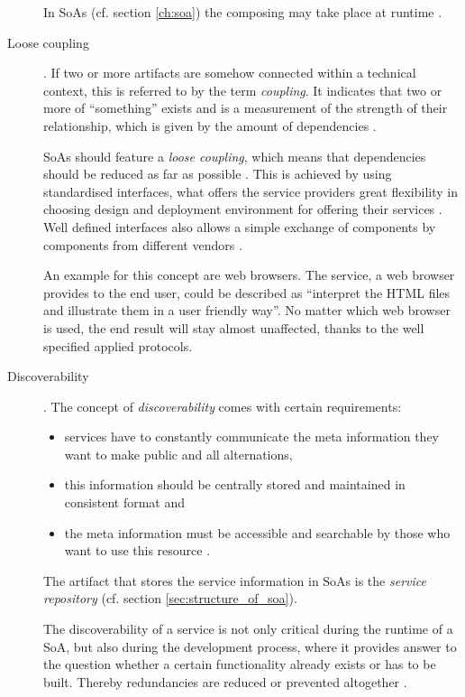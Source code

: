 \begin{description}
In SoAs (cf. section \ref{ch:soa}) the composing may take place at runtime \cite{breivold}.

\item [Loose coupling].
If two or more artifacts are somehow connected within a technical context, this is referred to by the term \emph{coupling}. It indicates that two or more of ``something'' exists and is a measurement of the strength of their relationship, which is given by the amount of dependencies \cite{erl2008}.

SoAs should feature a \emph{loose coupling}, which means that dependencies should be reduced as far as possible \cite{erl2008}. This is achieved by using standardised interfaces, what offers the service providers great flexibility in choosing design and deployment environment for offering their services \cite{breivold} \cite{arrowhead}. Well defined interfaces also allows a simple exchange of components by components from different vendors \cite{scholz}.

An example for this concept are web browsers. The service, a web browser provides to the end user, could be described as ``interpret the HTML files and illustrate them in a user friendly way''. No matter which web browser is used, the end result will stay almost unaffected, thanks to the well specified applied protocols.

\item [Discoverability]. 
The concept of \emph{discoverability} comes with certain requirements:
	\begin{itemize}
	\item services have to constantly communicate the meta information they want to make public and all alternations,
	\item this information should be centrally stored and maintained in consistent format and
	\item the meta information must be accessible and searchable by those who want to use this resource \cite[ch.12.]{erl2008}.
	\end{itemize}
The artifact that stores the service information in SoAs is the \emph{service repository} (cf. section \ref{sec:structure_of_soa}).

The discoverability of a service is not only critical during the runtime of a SoA, but also during the development process, where it provides answer to the question whether a certain functionality already exists or has to be built. Thereby redundancies are reduced or prevented altogether \cite[ch.12]{erl2008} \cite{arrowhead} \cite{breivold} \cite[p.27]{erl2011}.


\end{description}
